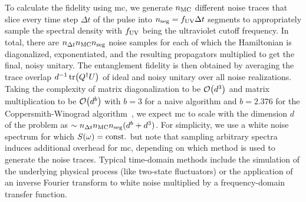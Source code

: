 To calculate the fidelity using \gls{mc}, we generate $n_{\mathrm{MC}}$ different noise traces that slice every time step $\Delta t$ of the pulse into $n_{\mathrm{seg}} = f_{\mathrm{UV}}\Delta t$ segments to appropriately sample the spectral density with $f_{\mathrm{UV}}$ being the ultraviolet cutoff frequency.
In total, there are $n_{\Delta t} n_{\mathrm{MC}} n_{\mathrm{seg}}$ noise samples for each of which the Hamiltonian is diagonalized, exponentiated, and the resulting propagators multiplied to get the final, noisy unitary.
The entanglement fidelity is then obtained by averaging the trace overlap $d^{-1}\tr(Q^\dagger U)$ of ideal and noisy unitary over all noise realizations.
Taking the complexity of matrix diagonalization to be $\order{d^3}$ and matrix multiplication to be $\order{d^b}$ with $b = 3$ for a naive algorithm and $b = \num{2.376}$ for the Coppersmith-Winograd algorithm~\cite{Coppersmith1990}, we expect \gls{mc} to scale with the dimension $d$ of the problem as $\sim n_{\Delta t} n_{\mathrm{MC}} n_{\mathrm{seg}} (d^b + d^3)$.
For simplicity, we use a white noise spectrum for which $S(\omega) = \mathrm{const.}$ but note that sampling arbitrary spectra induces additional overhead for \gls{mc}, depending on which method is used to generate the noise traces.
Typical time-domain methods include the simulation of the underlying physical process (like two-state fluctuators) or the application of an inverse Fourier transform to white noise multiplied by a frequency-domain transfer function.

